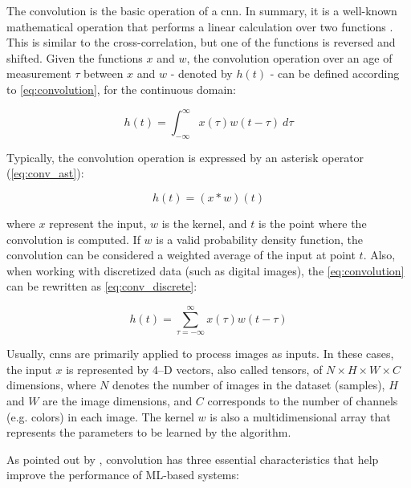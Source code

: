 The convolution is the basic operation of a \acs{cnn}. In summary, it is a well-known mathematical operation that performs a linear calculation over two functions \citep{goodfellow2016deep}. This is similar to the cross-correlation, but one of the functions is reversed and shifted. Given the functions $x$ and $w$, the convolution operation over an age of measurement $\tau$ between $x$ and $w$ - denoted by $h(t)$ - can be defined according to \autoref{eq:convolution}, for the continuous domain:

\begin{equation}
\label{eq:convolution}
h(t) = \int_{-\infty }^{\infty} x(\tau)w(t - \tau)\ d\tau
\end{equation}

\noindent
Typically, the convolution operation is expressed by an asterisk operator (\autoref{eq:conv_ast}):

\begin{equation}
\label{eq:conv_ast}
h(t) = (x * w)(t)
\end{equation}

\noindent
where $x$ represent the input, $w$ is the kernel, and $t$ is the point where the convolution is computed. If $w$ is a valid probability density function, the convolution can be considered a weighted average of the input at point $t$. Also, when working with discretized data (such as digital images), the \autoref{eq:convolution} can be rewritten as \autoref{eq:conv_discrete}:

\begin{equation}
\label{eq:conv_discrete}
h(t) = \sum_{\tau=-\infty}^{\infty} x(\tau)w(t - \tau)
\end{equation}

Usually, \acsp{cnn} are primarily applied to process images as inputs. In these cases, the input $x$ is represented by 4--D vectors, also called tensors, of $N \times H \times W \times C$ dimensions, where $N$ denotes the number of images in the dataset (samples), $H$ and $W$ are the image dimensions, and $C$ corresponds to the number of channels (e.g. colors) in each image. The kernel $w$ is also a multidimensional array that represents the parameters to be learned by the algorithm.

As pointed out by \cite{goodfellow2016deep}, convolution has three essential characteristics that help improve the performance of ML-based systems:

